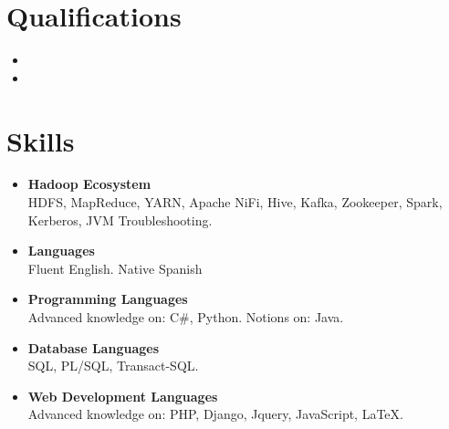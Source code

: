 \documentclass[11pt,a4paper,roman]{moderncv}        %
\begin{document}
\section{Qualifications}


\begin{itemize}
\item{}
\item{}
\end{itemize}

\section{Skills}
\begin{itemize}
\item \textbf{Hadoop Ecosystem}\\HDFS, MapReduce, YARN, Apache NiFi, Hive, Kafka, Zookeeper, Spark, Kerberos, JVM Troubleshooting.
\vspace{3pt}
\item \textbf{Languages} \\Fluent English. Native Spanish
\vspace{3pt}
\item \textbf{Programming Languages} \\Advanced knowledge on: C\#, Python. Notions on: Java.
\vspace{3pt}
\item \textbf{Database Languages} \\SQL, PL/SQL, Transact-SQL.
\vspace{3pt}
\item \textbf{Web Development Languages} \\Advanced knowledge on: PHP, Django, Jquery, JavaScript, \LaTeX.
\end{itemize}
\nocite{*}
\end{document}
